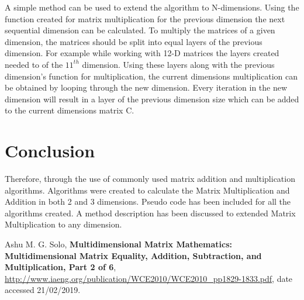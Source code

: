 \documentclass[twocolumn, 11pt]{IEEEtran}
\begin{document}
A simple method can be used to extend the algorithm to N-dimensions. Using the function created for matrix multiplication for the previous dimension the next sequential dimension can be calculated. To multiply the matrices of a given dimension, the matrices should be split into equal layers of the previous dimension. For example while working with 12-D matrices the layers created needed to of the $11^{th}$ dimension. Using these layers along with the previous dimension's function for multiplication, the current dimensions multiplication can be obtained by looping through the new dimension. Every iteration in the new dimension will result in a layer of the previous dimension size which can be added to the current dimensions matrix C.

\section{Conclusion}
Therefore, through the use of commonly used matrix addition and multiplication algorithms. Algorithms were created to calculate the Matrix Multiplication and Addition in both 2 and 3 dimensions. Pseudo code has been included for all the algorithms created. A method description has been discussed to extended Matrix Multiplication to any dimension.

\begin{thebibliography}{1}

 Ashu M. G. Solo, \textbf{Multidimensional Matrix Mathematics: Multidimensional Matrix Equality, Addition, Subtraction, and Multiplication, Part 2 of 6}, \url{http://www.iaeng.org/publication/WCE2010/WCE2010_pp1829-1833.pdf}, date  accessed 21/02/2019.


\end{thebibliography}
\end{document}
